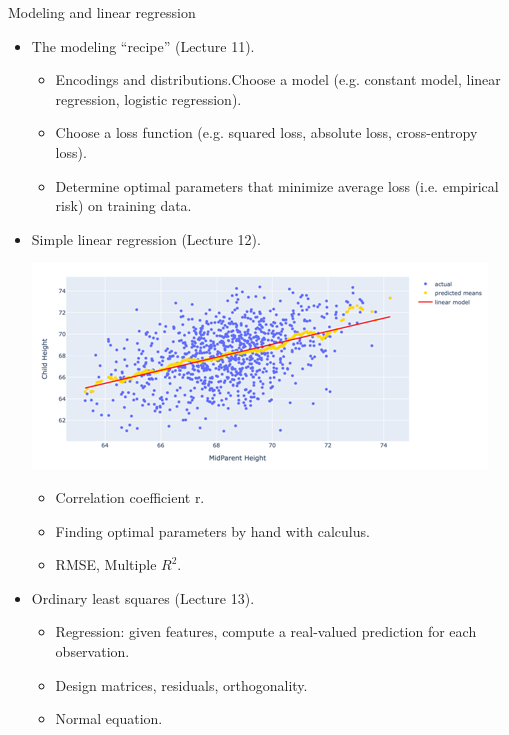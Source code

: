 \documentclass[aspectratio=169]{../latex_main/tntbeamer}  %
\begin{document}
	
	\begin{frame}{Modeling and linear regression}
	            \begin{itemize}
	                \item The modeling “recipe” (Lecture 11).
	                \begin{itemize}
	                    \item Encodings and distributions.Choose a model (e.g. constant model, linear regression, logistic regression).
	                    \item Choose a loss function (e.g. squared loss, absolute loss, cross-entropy loss).
	                    \item Determine optimal parameters that minimize average loss (i.e. empirical risk) on training data.
	                \end{itemize}
	                \item  Simple linear regression (Lecture 12).  
	                \begin{centering} 
                        \includegraphics[scale=.3]{Bild5}
                    \end{centering} 
	                \begin{itemize}
	                    \item Correlation coefficient r.
	                    \item Finding optimal parameters by hand with calculus.
	                    \item RMSE, Multiple $R^2$.
	                \end{itemize}
	                \item  Ordinary least squares (Lecture 13).
	                \begin{itemize}
	                    \item Regression: given features, compute a real-valued prediction for each observation.
	                    \item Design matrices, residuals, orthogonality.
	                    \item Normal equation.
	                \end{itemize}
	            \end{itemize}
	            
	              
	\end{frame}
	
\end{document}
